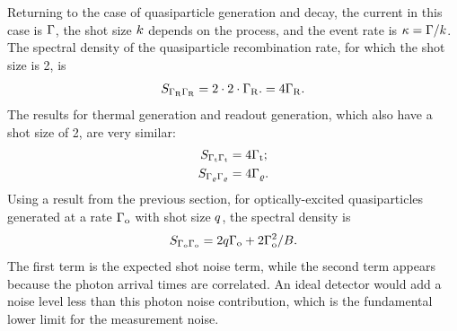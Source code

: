 Returning to the case of quasiparticle generation and decay, the current in this case is $\Gamma$, the shot size $k$ depends on the process, and the event rate is $\kappa = \Gamma / k$.
The spectral density of the quasiparticle recombination rate, for which the shot size is 2, is
\begin{equation}
S_{\Gamma_{\mathrm{R}} \Gamma_{\mathrm{R}}}
  =
  2 \cdot 2 \cdot \Gamma_{\mathrm{R}}.
  =
  4 \Gamma_{\mathrm{R}}.
\end{equation}
The results for thermal generation and readout generation, which also have a shot size of 2, are very similar:
\begin{align}
S_{\Gamma_{\mathrm{t}} \Gamma_{\mathrm{t}}}
  &=
  4 \Gamma_{\mathrm{t}}; \\
S_{\Gamma_\varrho \Gamma_\varrho}
  &=
  4 \Gamma_\varrho.
\end{align}
Using a result from the previous section, for optically-excited quasiparticles generated at a rate $\Gamma_{\mathrm{o}}$ with shot size $q$, the spectral density is
\begin{equation}
S_{\Gamma_{\mathrm{o}} \Gamma_{\mathrm{o}}}
  =
  2 q \Gamma_{\mathrm{o}} + 2 \Gamma_{\mathrm{o}}^2 / B.
\label{eqn:spectraldensity_generation_photon}
\end{equation}
The first term is the expected shot noise term, while the second term appears because the photon arrival times are correlated.
An ideal detector would add a noise level less than this photon noise contribution, which is the fundamental lower limit for the measurement noise.

